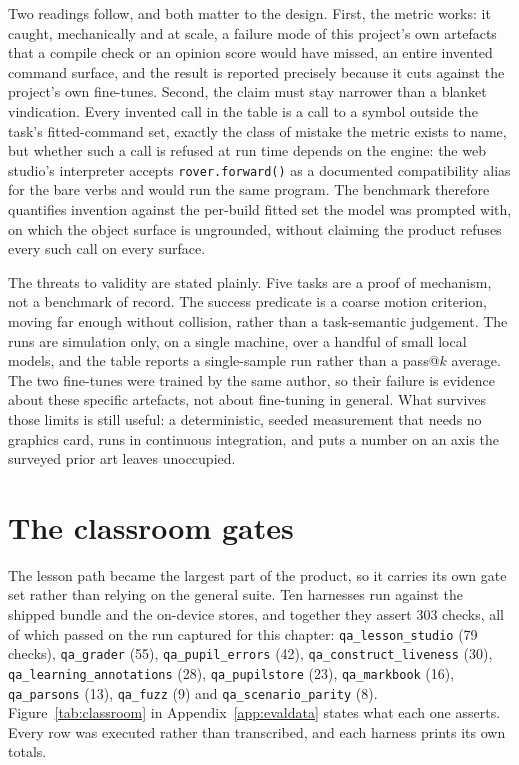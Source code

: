 \documentclass[11pt,a4paper]{report}
\begin{document}
Two readings follow, and both matter to the design. First, the metric works: it caught, mechanically and at scale, a failure mode of this project's own artefacts that a compile check or an opinion score would have missed, an entire invented command surface, and the result is reported precisely because it cuts against the project's own fine-tunes. Second, the claim must stay narrower than a blanket vindication. Every invented call in the table is a call to a symbol outside the task's fitted-command set, exactly the class of mistake the metric exists to name, but whether such a call is refused at run time depends on the engine: the web studio's interpreter accepts \texttt{rover.forward()} as a documented compatibility alias for the bare verbs and would run the same program. The benchmark therefore quantifies invention against the per-build fitted set the model was prompted with, on which the object surface is ungrounded, without claiming the product refuses every such call on every surface.

The threats to validity are stated plainly. Five tasks are a proof of mechanism, not a benchmark of record. The success predicate is a coarse motion criterion, moving far enough without collision, rather than a task-semantic judgement. The runs are simulation only, on a single machine, over a handful of small local models, and the table reports a single-sample run rather than a pass@$k$ average. The two fine-tunes were trained by the same author, so their failure is evidence about these specific artefacts, not about fine-tuning in general. What survives those limits is still useful: a deterministic, seeded measurement that needs no graphics card, runs in continuous integration, and puts a number on an axis the surveyed prior art leaves unoccupied.

\section{The classroom gates}
\label{sec:classroom-gates}
The lesson path became the largest part of the product, so it carries its own gate set rather than relying on the general suite. Ten harnesses run against the shipped bundle and the on-device stores, and together they assert 303 checks, all of which passed on the run captured for this chapter: \texttt{qa\_lesson\_studio} (79 checks), \texttt{qa\_grader} (55), \texttt{qa\_pupil\_errors} (42), \texttt{qa\_construct\_liveness} (30), \texttt{qa\_learning\_annotations} (28), \texttt{qa\_pupilstore} (23), \texttt{qa\_markbook} (16), \texttt{qa\_parsons} (13), \texttt{qa\_fuzz} (9) and \texttt{qa\_scenario\_parity} (8). Figure~\ref{tab:classroom} in Appendix~\ref{app:evaldata} states what each one asserts. Every row was executed rather than transcribed, and each harness prints its own totals.
\end{document}
